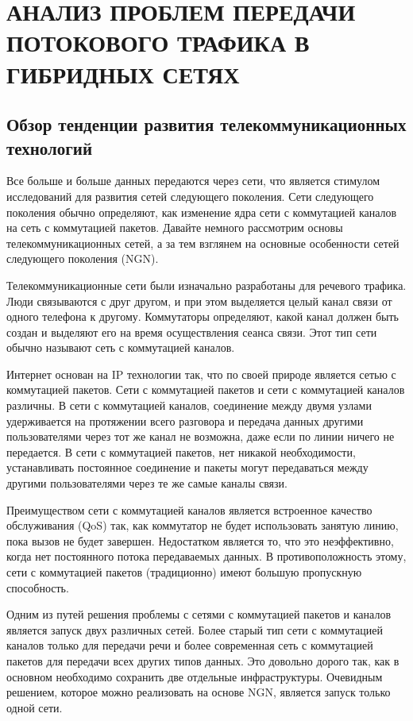 \chapter[АНАЛИЗ \ ПРОБЛЕМ \ ПЕРЕДАЧИ \ ПОТОКОВОГО ТРАФИКА В ГИБРИДНЫХ СЕТЯХ]{АНАЛИЗ ПРОБЛЕМ ПЕРЕДАЧИ ПОТОКОВОГО ТРАФИКА В ГИБРИДНЫХ СЕТЯХ} \label{chapt1}


\section{Обзор тенденции развития телекоммуникационных технологий} \label{sect1_0}

Все больше и больше данных передаются через сети, что является стимулом исследований для развития сетей следующего поколения.
Сети следующего поколения обычно определяют, как изменение ядра сети с коммутацией каналов на сеть с коммутацией пакетов.
Давайте немного рассмотрим основы телекоммуникационных сетей, а за тем взглянем на основные особенности сетей следующего поколения (NGN).

Телекоммуникационные сети были изначально разработаны для речевого трафика. 
Люди связываются с друг другом, и при этом выделяется целый канал связи от одного телефона к другому. 
Коммутаторы определяют, какой канал должен быть создан и выделяют его на время осуществления сеанса связи.
Этот тип сети обычно называют сеть с коммутацией каналов.

Интернет основан на IP технологии так, что по своей природе является сетью с коммутацией пакетов.
Сети с коммутацией пакетов и сети с коммутацией каналов различны.
В сети с коммутацией каналов, соединение между двумя узлами удерживается на протяжении всего разговора и передача данных другими пользователями через тот же канал не возможна, даже если по линии ничего не передается.
В сети с коммутацией пакетов, нет никакой необходимости, устанавливать постоянное соединение и пакеты могут передаваться между другими пользователями через те же самые каналы связи.

Преимуществом сети с коммутацией каналов является встроенное качество обслуживания (QoS) так, как коммутатор не будет использовать занятую линию, пока вызов не будет завершен.
Недостатком является то, что это неэффективно, когда нет постоянного потока передаваемых данных.
В противоположность этому, сети с коммутацией пакетов (традиционно) имеют большую пропускную способность.

Одним из путей решения проблемы с сетями с коммутацией пакетов и каналов является запуск двух различных сетей. 
Более старый тип сети с коммутацией каналов только для передачи речи и более современная сеть с коммутацией пакетов для передачи всех других типов данных.
Это довольно дорого так, как в основном необходимо сохранить две отдельные инфраструктуры.
Очевидным решением, которое можно реализовать на основе NGN, является запуск только одной сети.


